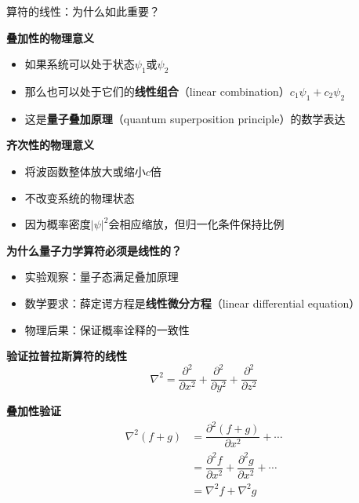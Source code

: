 \documentclass[aspectratio=169, 10pt]{beamer}
\begin{document}
\begin{frame}{算符的线性：为什么如此重要？}
  
  
  \begin{iqbitemize}
      \item \textbf{叠加性的物理意义}
      \begin{itemize}
        \setlength{\itemsep}{0.05cm}
        \item 如果系统可以处于状态$\psi_1$或$\psi_2$
        \item 那么也可以处于它们的\textbf{线性组合}（linear combination）$c_1\psi_1 + c_2\psi_2$
        \item 这是\textbf{量子叠加原理}（quantum superposition principle）的数学表达
      \end{itemize}

      \item \textbf{齐次性的物理意义}
      \begin{itemize}
        \setlength{\itemsep}{0.05cm}
        \item 将波函数整体放大或缩小$c$倍
        \item 不改变系统的物理状态
        \item 因为概率密度$|\psi|^2$会相应缩放，但归一化条件保持比例
      \end{itemize}

      \item \textbf{为什么量子力学算符必须是线性的？}
      \begin{itemize}
        \setlength{\itemsep}{0.05cm}
        \item 实验观察：量子态满足叠加原理
        \item 数学要求：薛定谔方程是\textbf{线性微分方程}（linear differential equation）
        \item 物理后果：保证概率诠释的一致性
      \end{itemize}
    \end{iqbitemize}
    \begin{iqbitemize}
      \item \textbf{验证拉普拉斯算符的线性}
      \[
        \nabla^2 = \dfrac{\partial^2}{\partial x^2} + \dfrac{\partial^2}{\partial y^2} + \dfrac{\partial^2}{\partial z^2}
      \]

      \item \textbf{叠加性验证}
      \begin{align*}
        \nabla^2(f+g) &= \dfrac{\partial^2(f+g)}{\partial x^2} + \cdots \\
                  &= \dfrac{\partial^2 f}{\partial x^2} + \dfrac{\partial^2 g}{\partial x^2} + \cdots \\
                  &= \nabla^2 f + \nabla^2 g
      \end{align*}


\end{iqbitemize}
\end{frame}
\end{document}

